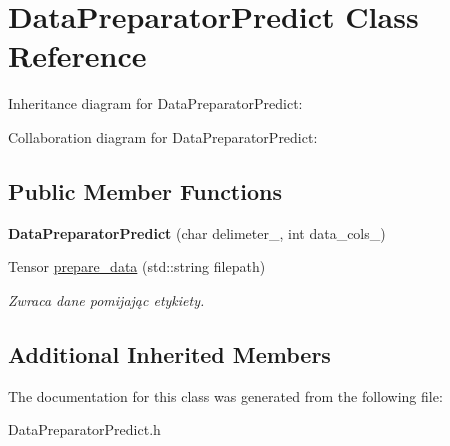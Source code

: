 \hypertarget{classDataPreparatorPredict}{}\section{Data\+Preparator\+Predict Class Reference}
\label{classDataPreparatorPredict}


Inheritance diagram for Data\+Preparator\+Predict\+:


Collaboration diagram for Data\+Preparator\+Predict\+:
\subsection*{Public Member Functions}
\begin{DoxyCompactItemize}
\item 
\mbox{\label{classDataPreparatorPredict_af1e3150bedc51b7a28da49609aabb88a}} 
{\bfseries Data\+Preparator\+Predict} (char delimeter\+\_\+, int data\+\_\+cols\+\_\+)
\item 
\mbox{\label{classDataPreparatorPredict_a82700df1faf93d703638596bbeb4c734}} 
Tensor \hyperlink{classDataPreparatorPredict_a82700df1faf93d703638596bbeb4c734}{prepare\+\_\+data} (std\+::string filepath)
\begin{DoxyCompactList}\small\item\em Zwraca dane pomijając etykiety. \end{DoxyCompactList}\end{DoxyCompactItemize}
\subsection*{Additional Inherited Members}


The documentation for this class was generated from the following file\+:\begin{DoxyCompactItemize}
\item 
Data\+Preparator\+Predict.\+h\end{DoxyCompactItemize}
